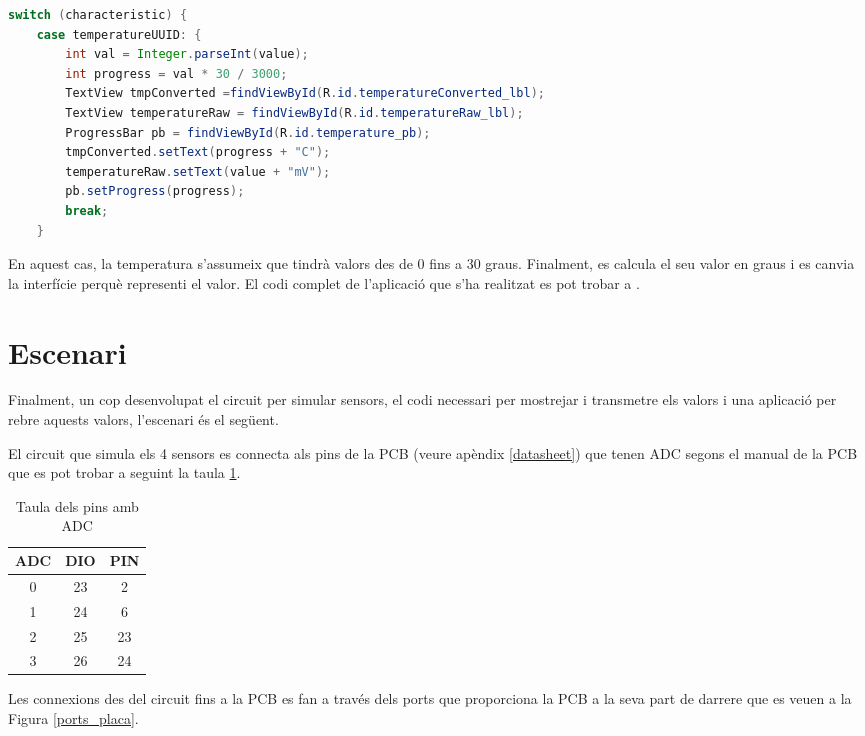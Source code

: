 \begin{lstlisting}[language=java]
 switch (characteristic) {
	case temperatureUUID: {
		int val = Integer.parseInt(value);
		int progress = val * 30 / 3000;
		TextView tmpConverted =findViewById(R.id.temperatureConverted_lbl);
		TextView temperatureRaw = findViewById(R.id.temperatureRaw_lbl);
		ProgressBar pb = findViewById(R.id.temperature_pb);
		tmpConverted.setText(progress + "C");
		temperatureRaw.setText(value + "mV");
		pb.setProgress(progress);
		break;
	}
\end{lstlisting}

En aquest cas, la temperatura s'assumeix que tindrà valors des de 0 fins a 30 graus.
Finalment, es calcula el seu valor en graus i es canvia la interfície perquè representi el valor.
El codi complet de l'aplicació que s'ha realitzat es pot trobar a \cite{android_repo}.

\section{Escenari}
Finalment, un cop desenvolupat el circuit per simular sensors, el codi necessari per mostrejar i transmetre els valors i una aplicació per rebre aquests valors, l'escenari és el següent.

El circuit que simula els 4 sensors es connecta als pins de la PCB (veure apèndix \ref{datasheet}) que tenen ADC segons el manual de la PCB que es pot trobar a \cite{manual_placa} seguint la taula \ref{connexions}.

\begin{table}[!h]
	\begin{center}
		\begin{tabular}{|c|c|c|}
			\hline
			ADC			&	DIO		& 	PIN		\\	\hline
			0			&	23		&	2		\\	\hline
			1			&	24		&	6		\\	\hline
			2			&	25		&	23		\\	\hline
			3			&	26		&	24		\\	\hline
		\end{tabular}
	\end{center}
	\caption{Taula dels pins amb ADC}
	\label{connexions}
\end{table}

Les connexions des del circuit fins a la PCB es fan a través dels ports que proporciona la PCB a la seva part de darrere que es veuen a la Figura \ref{ports_placa}.

